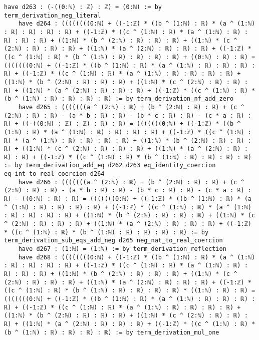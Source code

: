 \documentclass{article}
\begin{document}
\begin{tcolorbox}[colback=white!10, width=\linewidth]
\begin{lstlisting}[language=Lean4]
    have d263 : (-((0:ℕ) : ℤ) : ℤ) = (0:ℕ) := by term_derivation_neg_literal
    have d264 : ((((((((0:ℕ) + ((-1:ℤ) * ((b ^ (1:ℕ) : ℝ) * (a ^ (1:ℕ) : ℝ) : ℝ) : ℝ) : ℝ) + ((-1:ℤ) * ((c ^ (1:ℕ) : ℝ) * (a ^ (1:ℕ) : ℝ) : ℝ) : ℝ) : ℝ) + ((1:ℕ) * (b ^ (2:ℕ) : ℝ) : ℝ) : ℝ) + ((1:ℕ) * (c ^ (2:ℕ) : ℝ) : ℝ) : ℝ) + ((1:ℕ) * (a ^ (2:ℕ) : ℝ) : ℝ) : ℝ) + ((-1:ℤ) * ((c ^ (1:ℕ) : ℝ) * (b ^ (1:ℕ) : ℝ) : ℝ) : ℝ) : ℝ) + ((0:ℕ) : ℝ) : ℝ) = (((((((0:ℕ) + ((-1:ℤ) * ((b ^ (1:ℕ) : ℝ) * (a ^ (1:ℕ) : ℝ) : ℝ) : ℝ) : ℝ) + ((-1:ℤ) * ((c ^ (1:ℕ) : ℝ) * (a ^ (1:ℕ) : ℝ) : ℝ) : ℝ) : ℝ) + ((1:ℕ) * (b ^ (2:ℕ) : ℝ) : ℝ) : ℝ) + ((1:ℕ) * (c ^ (2:ℕ) : ℝ) : ℝ) : ℝ) + ((1:ℕ) * (a ^ (2:ℕ) : ℝ) : ℝ) : ℝ) + ((-1:ℤ) * ((c ^ (1:ℕ) : ℝ) * (b ^ (1:ℕ) : ℝ) : ℝ) : ℝ) : ℝ) := by term_derivation_nf_add_zero
    have d265 : (((((((a ^ (2:ℕ) : ℝ) + (b ^ (2:ℕ) : ℝ) : ℝ) + (c ^ (2:ℕ) : ℝ) : ℝ) - (a * b : ℝ) : ℝ) - (b * c : ℝ) : ℝ) - (c * a : ℝ) : ℝ) + ((-((0:ℕ) : ℤ) : ℤ) : ℝ) : ℝ) = (((((((0:ℕ) + ((-1:ℤ) * ((b ^ (1:ℕ) : ℝ) * (a ^ (1:ℕ) : ℝ) : ℝ) : ℝ) : ℝ) + ((-1:ℤ) * ((c ^ (1:ℕ) : ℝ) * (a ^ (1:ℕ) : ℝ) : ℝ) : ℝ) : ℝ) + ((1:ℕ) * (b ^ (2:ℕ) : ℝ) : ℝ) : ℝ) + ((1:ℕ) * (c ^ (2:ℕ) : ℝ) : ℝ) : ℝ) + ((1:ℕ) * (a ^ (2:ℕ) : ℝ) : ℝ) : ℝ) + ((-1:ℤ) * ((c ^ (1:ℕ) : ℝ) * (b ^ (1:ℕ) : ℝ) : ℝ) : ℝ) : ℝ) := by term_derivation_add_eq d262 d263 eq_identity_coercion eq_int_to_real_coercion d264
    have d266 : (((((((a ^ (2:ℕ) : ℝ) + (b ^ (2:ℕ) : ℝ) : ℝ) + (c ^ (2:ℕ) : ℝ) : ℝ) - (a * b : ℝ) : ℝ) - (b * c : ℝ) : ℝ) - (c * a : ℝ) : ℝ) - ((0:ℕ) : ℝ) : ℝ) = (((((((0:ℕ) + ((-1:ℤ) * ((b ^ (1:ℕ) : ℝ) * (a ^ (1:ℕ) : ℝ) : ℝ) : ℝ) : ℝ) + ((-1:ℤ) * ((c ^ (1:ℕ) : ℝ) * (a ^ (1:ℕ) : ℝ) : ℝ) : ℝ) : ℝ) + ((1:ℕ) * (b ^ (2:ℕ) : ℝ) : ℝ) : ℝ) + ((1:ℕ) * (c ^ (2:ℕ) : ℝ) : ℝ) : ℝ) + ((1:ℕ) * (a ^ (2:ℕ) : ℝ) : ℝ) : ℝ) + ((-1:ℤ) * ((c ^ (1:ℕ) : ℝ) * (b ^ (1:ℕ) : ℝ) : ℝ) : ℝ) : ℝ) := by term_derivation_sub_eqs_add_neg d265 neg_nat_to_real_coercion
    have d267 : (1:ℕ) = (1:ℕ) := by term_derivation_reflection
    have d268 : ((((((((0:ℕ) + ((-1:ℤ) * ((b ^ (1:ℕ) : ℝ) * (a ^ (1:ℕ) : ℝ) : ℝ) : ℝ) : ℝ) + ((-1:ℤ) * ((c ^ (1:ℕ) : ℝ) * (a ^ (1:ℕ) : ℝ) : ℝ) : ℝ) : ℝ) + ((1:ℕ) * (b ^ (2:ℕ) : ℝ) : ℝ) : ℝ) + ((1:ℕ) * (c ^ (2:ℕ) : ℝ) : ℝ) : ℝ) + ((1:ℕ) * (a ^ (2:ℕ) : ℝ) : ℝ) : ℝ) + ((-1:ℤ) * ((c ^ (1:ℕ) : ℝ) * (b ^ (1:ℕ) : ℝ) : ℝ) : ℝ) : ℝ) * ((1:ℕ) : ℝ) : ℝ) = (((((((0:ℕ) + ((-1:ℤ) * ((b ^ (1:ℕ) : ℝ) * (a ^ (1:ℕ) : ℝ) : ℝ) : ℝ) : ℝ) + ((-1:ℤ) * ((c ^ (1:ℕ) : ℝ) * (a ^ (1:ℕ) : ℝ) : ℝ) : ℝ) : ℝ) + ((1:ℕ) * (b ^ (2:ℕ) : ℝ) : ℝ) : ℝ) + ((1:ℕ) * (c ^ (2:ℕ) : ℝ) : ℝ) : ℝ) + ((1:ℕ) * (a ^ (2:ℕ) : ℝ) : ℝ) : ℝ) + ((-1:ℤ) * ((c ^ (1:ℕ) : ℝ) * (b ^ (1:ℕ) : ℝ) : ℝ) : ℝ) : ℝ) := by term_derivation_mul_one

\end{lstlisting}
\end{tcolorbox}
\end{document}
